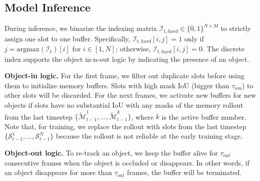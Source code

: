 \subsection{Model Inference}
During inference, we binarize the indexing matrix $ \mathcal{I}_{t,hard} \in \{0,1\}^{N\times M}$ to strictly assign one slot to one buffer. 
Specifically, $\mathcal{I}_{t,hard}[i,j] = 1$ only if $j = \text{argmax}(\mathcal{I}_{t})[i]$ for $i \in [1,N]$; otherwise, $\mathcal{I}_{t,hard}[i,j] = 0 $. The discrete index supports the object in-n-out logic by indicating the presence of an object.

 \vspace{+2.5mm}
\noindent \textbf{Object-in logic.} For  the first frame, we filter out duplicate slots before using them to initialize memory buffers. Slots with high mask IoU (bigger than $\tau_{iou}$) to other slots will be discarded. For the next  frames, we activate new buffers for new objects if slots have no substantial IoU with any masks of the memory rollout from the last timestep $\{\tilde {\mathcal{M}}_{t-1}^1,...,\tilde {\mathcal{M}}_{t-1}^k \}$, where $k$ is the active buffer number. Note that, for training, we replace the rollout with slots from the last timestep $\{\mathcal{S}_{t-1}^1,...,\mathcal{S}_{t-1}^N \}$ because the rollout is not reliable at the early training stage.

\vspace{+2.5mm}
\noindent \textbf{Object-out logic.} To re-track an object, we keep the buffer alive for $\tau_{out}$ consecutive frames when the object is occluded or disappears. In other words, if an object disappears for more than $\tau_{out}$ frames, the buffer will be terminated.

